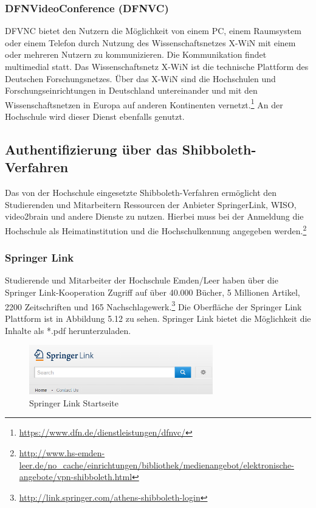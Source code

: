 \subsubsection{DFNVideoConference (DFNVC)}
DFVNC bietet den Nutzern die Möglichkeit von einem PC, einem Raumsystem oder einem Telefon durch Nutzung des Wissenschaftsnetzes X-WiN mit einem oder mehreren Nutzern zu kommunizieren. Die Kommunikation findet multimedial statt. Das Wissenschaftsnetz X-WiN ist die technische Plattform des Deutschen Forschungsnetzes. Über das X-WiN sind die Hochschulen und Forschungseinrichtungen in Deutschland untereinander und mit den Wissenschaftsnetzen in Europa auf anderen Kontinenten vernetzt.\footnote{\url{https://www.dfn.de/dienstleistungen/dfnvc/}} An der Hochschule wird dieser Dienst ebenfalls genutzt.

\subsection{Authentifizierung über das Shibboleth-Verfahren}
Das von der Hochschule eingesetzte Shibboleth-Verfahren ermöglicht den Studierenden und Mitarbeitern Ressourcen der Anbieter SpringerLink, WISO, video2brain und andere Dienste zu nutzen. Hierbei muss bei der Anmeldung die Hochschule als Heimatinstitution und die Hochschulkennung angegeben werden.\footnote{\url{http://www.hs-emden-leer.de/no_cache/einrichtungen/bibliothek/medienangebot/elektronische-angebote/vpn-shibboleth.html}}

\subsubsection{Springer Link}
Studierende und Mitarbeiter der Hochschule Emden/Leer haben über die Springer Link-Kooperation Zugriff auf über 40.000 Bücher, 5 Millionen Artikel, 2200 Zeitschriften und 165 Nachschlagewerk.\footnote{\url{http://link.springer.com/athens-shibboleth-login}} Die Oberfläche der Springer Link Plattform ist in Abbildung 5.12 zu sehen. Springer Link bietet die Möglichkeit die Inhalte als *.pdf herunterzuladen. 

\begin{figure}[h!]
	\centering
	\includegraphics[width=8cm]{kapitel/gruppe2/bilder/springerlink_startseite}
	\caption{Springer Link Startseite}
	\label{fig_springerlink_startseite}
\end{figure}

